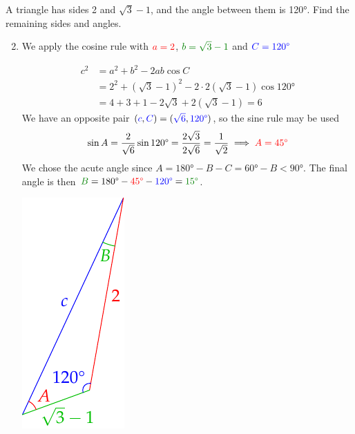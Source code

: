 \begin{examples}{}{}
	\exstart A triangle has sides 2 and $\sqrt 3-1$, and the angle between them is \ang{120}. Find the remaining sides and angles.%
	\begin{enumerate}\setcounter{enumi}{1}
		\item[] We apply the cosine rule with $\textcolor{red}{a=2}$, $\textcolor{Green}{b=\sqrt 3-1}$ and $\textcolor{blue}{C=\ang{120}}$\par
		\begin{minipage}[t]{0.79\linewidth}\vspace{-20pt}
		  \begin{align*}
		    c^2&=a^2+b^2-2ab\cos C\\
		    &=2^2+(\sqrt 3-1)^2-2\cdot 2(\sqrt 3-1)\cos\ang{120} \\
		    &=4+3+1-2\sqrt 3+2(\sqrt 3-1) =6
		  \end{align*}
		  We have an opposite pair $(\textcolor{blue}{c},\textcolor{blue}{C})=(\textcolor{blue}{\sqrt 6},\textcolor{blue}{\ang{120}})$, so the sine rule may be used
		  \[
		  	\sin A=\frac 2{\sqrt 6}\sin\ang{120}=\frac{2\sqrt 3}{2\sqrt 6}=\frac 1{\sqrt 2}\implies \textcolor{red}{A=\ang{45}}
		  \]
		  We chose the acute angle since $A=\ang{180}-B-C=\ang{60}-B<\ang{90}$.\smallbreak
		  The final angle is then $\textcolor{Green}{B}=\ang{180}-\textcolor{red}{\ang{45}}-\textcolor{blue}{\ang{120}}=\textcolor{Green}{\ang{15}}$.
		\end{minipage}
		\hfill
		\begin{minipage}[t]{0.2\linewidth}\vspace{-28pt}
			\flushright\includegraphics{exsas}
		\end{minipage}\smallbreak
		

\end{enumerate}
\end{examples}
